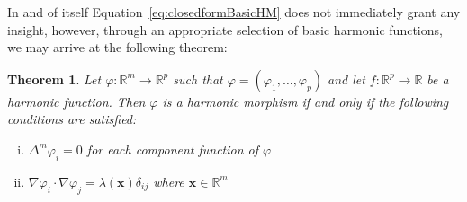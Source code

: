 \documentclass[12pt]{article}
\newtheorem{theorem}{Theorem}[section]
\theoremstyle{definition}
\numberwithin{equation}{subsection}
\begin{document}
In and of itself Equation~\ref{eq:closedformBasicHM} does not immediately grant any insight, however, through an appropriate selection of basic harmonic functions, we may arrive at the following theorem:

\begin{theorem} \label{th: HMproperties}
Let $\varphi: \mathbb{R}^m \rightarrow \mathbb{R}^p$ such that $\varphi = (\varphi_1 , \dots , \varphi_p)$ and let $f: \mathbb{R}^p \rightarrow \mathbb{R}$ be a harmonic function. Then $\varphi$ is a harmonic morphism if and only if the following conditions are satisfied:
\begin{enumerate}[(i)]
    \item $\Delta^m \varphi_i = 0$ for each component function of $\varphi$
    \item$\nabla\varphi_i \cdot \nabla\varphi_j = \lambda(\mathbf{x}) \delta_{ij}$ where $\mathbf{x} \in \mathbb{R}^m$
\end{enumerate}
\end{theorem}
\end{document}
